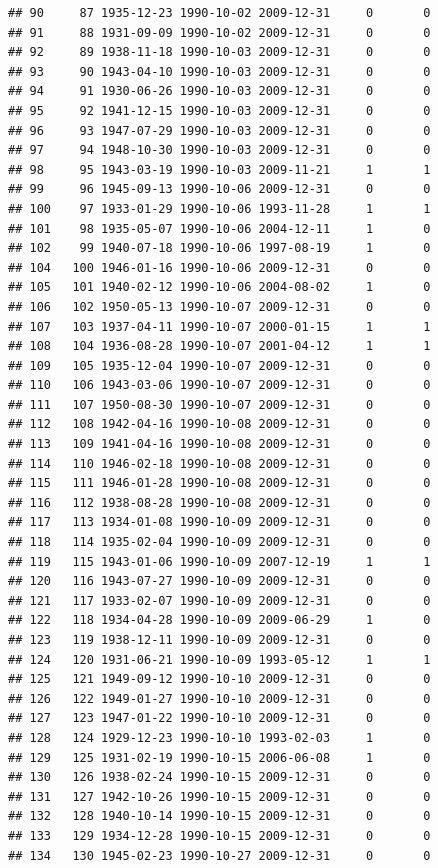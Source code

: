 \documentclass[
]{book}
\theoremstyle{definition}
\theoremstyle{definition}
\theoremstyle{definition}
\theoremstyle{definition}
\theoremstyle{remark}
\begin{document}
\begin{verbatim}
## 90     87 1935-12-23 1990-10-02 2009-12-31     0       0
## 91     88 1931-09-09 1990-10-02 2009-12-31     0       0
## 92     89 1938-11-18 1990-10-03 2009-12-31     0       0
## 93     90 1943-04-10 1990-10-03 2009-12-31     0       0
## 94     91 1930-06-26 1990-10-03 2009-12-31     0       0
## 95     92 1941-12-15 1990-10-03 2009-12-31     0       0
## 96     93 1947-07-29 1990-10-03 2009-12-31     0       0
## 97     94 1948-10-30 1990-10-03 2009-12-31     0       0
## 98     95 1943-03-19 1990-10-03 2009-11-21     1       1
## 99     96 1945-09-13 1990-10-06 2009-12-31     0       0
## 100    97 1933-01-29 1990-10-06 1993-11-28     1       1
## 101    98 1935-05-07 1990-10-06 2004-12-11     1       0
## 102    99 1940-07-18 1990-10-06 1997-08-19     1       0
## 104   100 1946-01-16 1990-10-06 2009-12-31     0       0
## 105   101 1940-02-12 1990-10-06 2004-08-02     1       0
## 106   102 1950-05-13 1990-10-07 2009-12-31     0       0
## 107   103 1937-04-11 1990-10-07 2000-01-15     1       1
## 108   104 1936-08-28 1990-10-07 2001-04-12     1       1
## 109   105 1935-12-04 1990-10-07 2009-12-31     0       0
## 110   106 1943-03-06 1990-10-07 2009-12-31     0       0
## 111   107 1950-08-30 1990-10-07 2009-12-31     0       0
## 112   108 1942-04-16 1990-10-08 2009-12-31     0       0
## 113   109 1941-04-16 1990-10-08 2009-12-31     0       0
## 114   110 1946-02-18 1990-10-08 2009-12-31     0       0
## 115   111 1946-01-28 1990-10-08 2009-12-31     0       0
## 116   112 1938-08-28 1990-10-08 2009-12-31     0       0
## 117   113 1934-01-08 1990-10-09 2009-12-31     0       0
## 118   114 1935-02-04 1990-10-09 2009-12-31     0       0
## 119   115 1943-01-06 1990-10-09 2007-12-19     1       1
## 120   116 1943-07-27 1990-10-09 2009-12-31     0       0
## 121   117 1933-02-07 1990-10-09 2009-12-31     0       0
## 122   118 1934-04-28 1990-10-09 2009-06-29     1       0
## 123   119 1938-12-11 1990-10-09 2009-12-31     0       0
## 124   120 1931-06-21 1990-10-09 1993-05-12     1       1
## 125   121 1949-09-12 1990-10-10 2009-12-31     0       0
## 126   122 1949-01-27 1990-10-10 2009-12-31     0       0
## 127   123 1947-01-22 1990-10-10 2009-12-31     0       0
## 128   124 1929-12-23 1990-10-10 1993-02-03     1       0
## 129   125 1931-02-19 1990-10-15 2006-06-08     1       0
## 130   126 1938-02-24 1990-10-15 2009-12-31     0       0
## 131   127 1942-10-26 1990-10-15 2009-12-31     0       0
## 132   128 1940-10-14 1990-10-15 2009-12-31     0       0
## 133   129 1934-12-28 1990-10-15 2009-12-31     0       0
## 134   130 1945-02-23 1990-10-27 2009-12-31     0       0

\end{verbatim}
\end{document}
